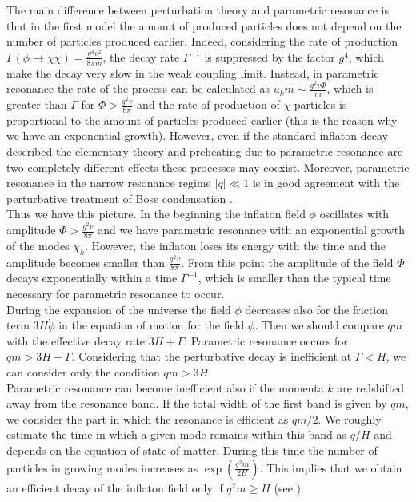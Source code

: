 \documentclass[11pt,a4paper,twoside]{book}
\begin{document}
The main difference between  perturbation theory and parametric resonance is that in the first model the amount of produced particles does not depend on the number of particles produced earlier. Indeed, considering the rate of production $ \Gamma(\phi \rightarrow \chi \chi) = \frac{g^{4}v^{2}}{8\pi m} $, the decay rate $ \Gamma^{-1} $ is suppressed by the factor $ g^{4} $, which make the decay very slow in the weak coupling limit. Instead, in parametric resonance the rate of the process can be calculated as $ u_{k}m \sim \frac{g^{2} v \Phi}{m} $, which is greater than $\Gamma$ for $ \Phi > \frac{g^{2}v}{8\pi} $ and the rate of production of $ \chi $-particles is proportional to the amount of particles produced earlier (this is the reason why we have an exponential growth). However, even if the standard inflaton decay described the elementary theory and  preheating due to parametric resonance are two completely different effects these processes may coexist. Moreover, parametric resonance in the narrow resonance regime  $ |q| \ll 1 $ is in good agreement with the perturbative treatment of Bose condensation \cite{Chap4:Lozanov}.\\
Thus we have this picture. In the beginning the inflaton field $\phi$ oscillates with amplitude $ \Phi > \frac{g^{2} v}{8\pi} $ and we have parametric resonance with an exponential growth of the modes $\chi_{k}$. However, the inflaton loses its energy with the time and the amplitude becomes smaller than $ \frac{g^{2}v}{8\pi} $. From this point the amplitude of the field $ \Phi $ decays exponentially within a time $ \Gamma^{-1} $, which is smaller than the typical time necessary for parametric resonance to occur. \\
During the expansion of the universe the field $\phi$ decreases also for the friction term $ 3H\dot{\phi} $ in the equation of motion for the field $\phi$. Then we should compare $ qm $ with the effective decay rate $ 3H + \Gamma $. Parametric resonance occurs for $ qm > 3H + \Gamma $. Considering that the perturbative decay is inefficient at $ \Gamma < H $, we can consider only the condition $ qm > 3H $.\\
Parametric resonance can become inefficient also if the  momenta $ k $ are redshifted away from the resonance band. If the total width of the first band is given by $ qm $, we consider the part in which the resonance is efficient as $ qm/2 $. We roughly estimate the time in which a given mode remains within this band as $ q/H $ and depends on the equation of state of matter. During this time the number of particles in growing modes increases as $ \exp(\frac{q^{2}m}{2H}) $. This implies that we obtain an efficient decay of the inflaton field only if $ q^{2}m \ge H $ (see \cite{Chap4:LindePreheatingModel}). \\
\end{document}
